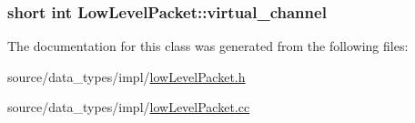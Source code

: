 \hypertarget{classLowLevelPacket_3fa4ac5563bbf3005a809c0b193f4c84}{
\subsubsection[{virtual\_\-channel}]{\setlength{\rightskip}{0pt plus 5cm}short int {\bf LowLevelPacket::virtual\_\-channel}}}
\label{classLowLevelPacket_3fa4ac5563bbf3005a809c0b193f4c84}




The documentation for this class was generated from the following files:\begin{CompactItemize}
\item 
source/data\_\-types/impl/\hyperlink{lowLevelPacket_8h}{lowLevelPacket.h}\item 
source/data\_\-types/impl/\hyperlink{lowLevelPacket_8cc}{lowLevelPacket.cc}\end{CompactItemize}
